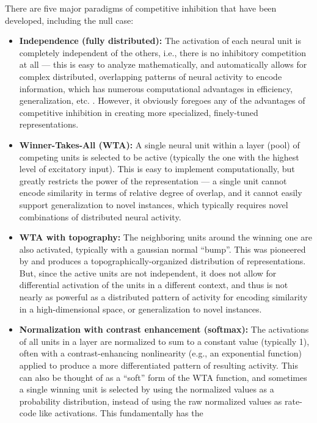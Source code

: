 \documentclass[11pt,twoside]{article}
\begin{document}
There are five major paradigms of competitive inhibition that have been
developed, including the null case:
\begin{itemize}
\item {\bf Independence (fully distributed):} The activation of each neural
  unit is completely independent of the others, i.e., there is no inhibitory
  competition at all --- this is easy to analyze mathematically, and
  automatically allows for complex distributed, overlapping patterns of neural
  activity to encode information, which has numerous computational advantages
  in efficiency, generalization, etc. \cite{RumelhartHintonWilliams86}.  However, it obviously
  foregoes any of the advantages of competitive inhibition in creating more
  specialized, finely-tuned representations.
\item {\bf Winner-Takes-All (WTA):} A single neural unit within a layer (pool)
  of competing units is selected to be active (typically the one with the
  highest level of excitatory input).  This is easy to implement
  computationally, but greatly restricts the power of the representation --- a
  single unit cannot encode similarity in terms of relative degree of overlap,
  and it cannot easily support generalization to novel instances, which
  typically requires novel combinations of distributed neural activity.
\item {\bf WTA with topography:} The neighboring units around the winning one
  are also activated, typically with a gaussian normal ``bump''.  This was
  pioneered by  and produces a topographically-organized distribution
  of representations.  But, since the active units are not independent, it does not allow for differential activation of
  the units in a different context, and thus is not nearly as powerful as a distributed pattern of
  activity for encoding similarity in a high-dimensional space, or generalization to novel instances.
\item {\bf Normalization with contrast enhancement (softmax):} The activations
  of all units in a layer are normalized to sum to a constant value (typically
  1), often with a contrast-enhancing nonlinearity (e.g., an exponential
  function) applied to produce a more differentiated pattern of resulting
  activity.  This can also be thought of as a ``soft'' form of the WTA
  function, and sometimes a single winning unit is selected by using the
  normalized values as a probability distribution, instead of using the raw
  normalized values as rate-code like activations.  This fundamentally has the

\end{itemize}
\end{document}

